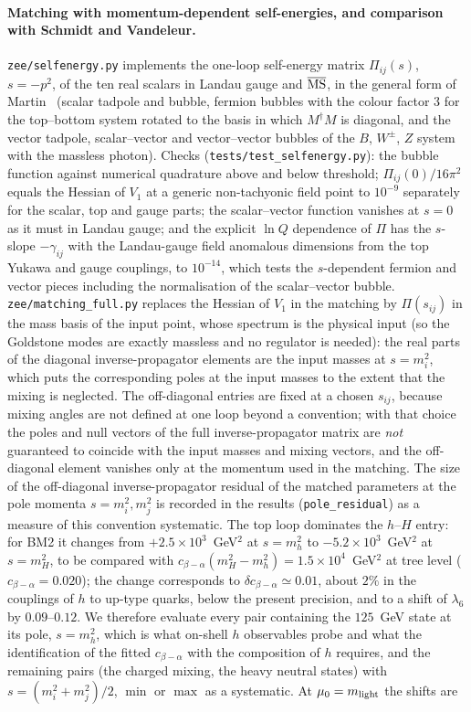 \documentclass[twocolumn,epjc3]{svjour3}
\begin{document}
\paragraph{Matching with momentum-dependent self-energies, and comparison with Schmidt and Vandeleur.} \texttt{zee/selfenergy.py} implements the one-loop self-energy matrix $\Pi_{ij}(s)$, $s=-p^2$, of the ten real scalars in Landau gauge and $\overline{\rm MS}$, in the general form of Martin~\cite{Martin:2003qz} (scalar tadpole and bubble, fermion bubbles with the colour factor $3$ for the top--bottom system rotated to the basis in which $M^\dagger M$ is diagonal, and the vector tadpole, scalar--vector and vector--vector bubbles of the $B$, $W^\pm$, $Z$ system with the massless photon). Checks (\texttt{tests/test\_selfenergy.py}): the bubble function against numerical quadrature above and below threshold; $\Pi_{ij}(0)/16\pi^2$ equals the Hessian of $V_1$ at a generic non-tachyonic field point to $10^{-9}$ separately for the scalar, top and gauge parts; the scalar--vector function vanishes at $s=0$ as it must in Landau gauge; and the explicit $\ln Q$ dependence of $\Pi$ has the $s$-slope $-\gamma_{ij}$ with the Landau-gauge field anomalous dimensions from the top Yukawa and gauge couplings, to $10^{-14}$, which tests the $s$-dependent fermion and vector pieces including the normalisation of the scalar--vector bubble. \texttt{zee/matching\_full.py} replaces the Hessian of $V_1$ in the matching by $\Pi(s_{ij})$ in the mass basis of the input point, whose spectrum is the physical input (so the Goldstone modes are exactly massless and no regulator is needed): the real parts of the diagonal inverse-propagator elements are the input masses at $s=m_i^2$, which puts the corresponding poles at the input masses to the extent that the mixing is neglected. The off-diagonal entries are fixed at a chosen $s_{ij}$, because mixing angles are not defined at one loop beyond a convention; with that choice the poles and null vectors of the full inverse-propagator matrix are \emph{not} guaranteed to coincide with the input masses and mixing vectors, and the off-diagonal element vanishes only at the momentum used in the matching. The size of the off-diagonal inverse-propagator residual of the matched parameters at the pole momenta $s=m_i^2,m_j^2$ is recorded in the results (\texttt{pole\_residual}) as a measure of this convention systematic. The top loop dominates the $h$--$H$ entry: for BM2 it changes from $+2.5\times10^{3}$~GeV$^2$ at $s=m_h^2$ to $-5.2\times10^{3}$~GeV$^2$ at $s=m_H^2$, to be compared with $c_{\beta-\alpha}(m_H^2-m_h^2)=1.5\times10^{4}$~GeV$^2$ at tree level ($c_{\beta-\alpha}=0.020$); the change corresponds to $\delta c_{\beta-\alpha}\simeq0.01$, about $2\%$ in the couplings of $h$ to up-type quarks, below the present precision, and to a shift of $\lambda_6$ by $0.09$--$0.12$. We therefore evaluate every pair containing the $125$~GeV state at its pole, $s=m_h^2$, which is what on-shell $h$ observables probe and what the identification of the fitted $c_{\beta-\alpha}$ with the composition of $h$ requires, and the remaining pairs (the charged mixing, the heavy neutral states) with $s=(m_i^2+m_j^2)/2$, $\min$ or $\max$ as a systematic. At $\mu_0=m_{\rm light}$ the shifts are 
\end{document}
